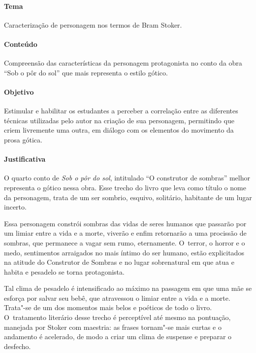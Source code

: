 \documentclass[12pt]{extarticle}
\begin{document}

\paragraph{Tema} Caracterização de personagem nos termos de Bram Stoker.

\paragraph{Conteúdo} Compreensão das características da personagem protagonista 
no conto da obra ``Sob o pôr do sol'' que mais representa o estilo gótico.  

\paragraph{Objetivo} Estimular e habilitar os estudantes a perceber a 
correlação entre as diferentes técnicas utilizadas pelo autor na criação de sua 
personagem, permitindo que criem livremente uma outra, em diálogo com os elementos 
do movimento da prosa gótica. 

\paragraph{Justificativa} O quarto conto de \textit{Sob o pôr do sol}, intitulado 
``O construtor de sombras'' melhor representa o gótico nessa obra. Esse trecho do livro 
que leva como título o nome da personagem, trata de um ser sombrio, esquivo, solitário, 
habitante de um lugar incerto. 

Essa personagem constrói sombras das vidas de seres humanos que passarão por um limiar entre 
a vida e  a morte, viverão e enfim retornarão a uma procissão de sombras, que permanece a 
vagar sem rumo, eternamente. O~terror, o horror e o medo, sentimentos arraigados
no mais íntimo do ser humano, estão explicitados na atitude do
Construtor de Sombras e no lugar sobrenatural em que atua e habita e pesadelo se
torna protagonista. 

Tal clima de pesadelo é intensificado ao máximo na
passagem em que uma mãe se esforça por salvar seu bebê, que atravessou o
limiar entre a vida e a morte. Trata"-se de um dos momentos mais belos e poéticos de todo 
o livro. O~tratamento literário desse trecho é perceptível até mesmo na pontuação, manejada
por Stoker com maestria: as frases tornam"-se mais curtas e o andamento é
acelerado, de modo a criar um clima de suspense e preparar o desfecho.
\end{document}
